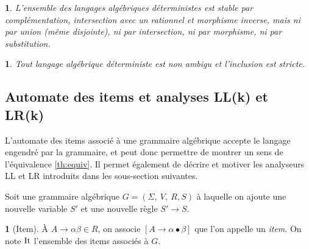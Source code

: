 \documentclass[11pt,a4paper]{article}
\theoremstyle{plain}
\theoremstyle{definition}
\newtheorem{defn}[thm]{\protect\definitionname}
\theoremstyle{definition}
\theoremstyle{remark}
\theoremstyle{remark}
\theoremstyle{plain}
\theoremstyle{plain}
\newtheorem{prop}[thm]{\protect\propositionname}
\theoremstyle{plain}
\theoremstyle{remark}
\providecommand{\definitionname}{Définition}
\providecommand{\propositionname}{Proposition}
\begin{document}
\begin{prop}
	L'ensemble des langages algébriques déterministes est stable par complémentation, intersection avec un rationnel et morphisme inverse, mais ni par union (même disjointe), ni par intersection, ni par morphisme, ni par substitution.
\end{prop}

\begin{prop} %
	Tout langage algébrique déterministe est non ambigu et l'inclusion est stricte.
\end{prop}

\subsection{Automate des items et analyses LL(k) et LR(k)}

L'automate des items associé à une grammaire algébrique accepte le langage engendré par la grammaire, et peut donc permettre de montrer un sens de l'équivalence \ref{th:equiv}. Il permet également de décrire et motiver les analyseurs LL et LR introduits dans les sous-section suivantes.

Soit une grammaire algébrique $G=\left(\Sigma,\ V,\ R, S\right)$ à
laquelle on ajoute une nouvelle variable $S'$ et une nouvelle règle
$S'\to S$.

\begin{defn}[Item]
À $A\to\alpha\beta\in R$, on associe $\left[A\to\alpha\bullet\beta\right]$
que l'on appelle un \emph{item}. On note $\operatorname{It}$ l'ensemble des items associés
à $G$.
\end{defn}
\end{document}
